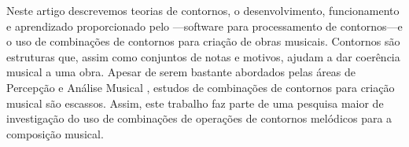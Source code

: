 Neste artigo descrevemos teorias de contornos, o desenvolvimento,
funcionamento e aprendizado proporcionado pelo \goiaba{}---software
para processamento de contornos---e o uso de combinações de contornos
para criação de obras musicais. Contornos são estruturas que, assim
como conjuntos de notas e motivos, ajudam a dar coerência musical a
uma obra. Apesar de serem bastante abordados pelas áreas de Percepção
e Análise Musical , estudos de combinações de contornos para criação
musical são escassos. Assim, este trabalho faz parte de uma pesquisa
maior de investigação do uso de combinações de operações de contornos
melódicos para a composição musical.
